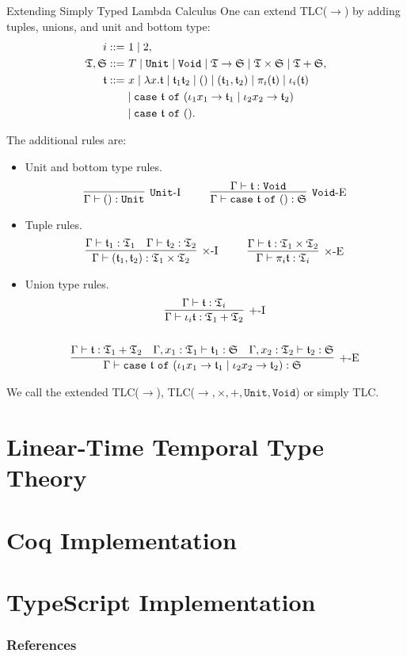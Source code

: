 \begin{frame}[allowframebreaks]{Extending Simply Typed Lambda Calculus}
    One can extend TLC($\rightarrow$) by adding tuples, unions, and unit and bottom type:
    \begin{align*}
    i ::=&~ 1 \mid 2, \\
    \mathfrak{T}, \mathfrak{S} ::=&~ T \mid \mathtt{Unit} \mid \mathtt{Void} \mid \mathfrak{T} \rightarrow \mathfrak{S} \mid \mathfrak{T} \times \mathfrak{S} \mid \mathfrak{T} + \mathfrak{S}, \\
    \mathfrak{t} ::=&~ x \mid \lambda x. \mathfrak{t} \mid \mathfrak{t}_1 \mathfrak{t}_2 \mid () \mid (\mathfrak{t}_1, \mathfrak{t}_2) \mid \pi_i(\mathfrak{t}) \mid \iota_i(\mathfrak{t}) \\ &\mid \mathtt{case}~\mathfrak{t}~\mathtt{of}~(\iota_1 x_1 \rightarrow \mathfrak{t}_1 \mid \iota_2 x_2 \rightarrow \mathfrak{t}_2) \\
    &\mid \mathtt{case}~\mathfrak{t}~\mathtt{of}~().
    \end{align*}
    
    The additional rules are:
    \begin{itemize}
        \item Unit and bottom type rules.
        \[
        \infer[\mathtt{Unit}\mbox{-I}]{\Gamma \vdash () : \mathtt{Unit}}{}
        ~~~~ ~~~~
        \infer[\mathtt{Void}\mbox{-E}]{\Gamma \vdash \mathtt{case}~\t~\mathtt{of}~() : \mathfrak{S}}{\Gamma \vdash \t : \mathtt{Void}}
        \]
        \item Tuple rules.
        \[
        \infer[\times\mbox{-I}]{\Gamma \vdash (\t_1, \t_2) : \T_1 \times \T_2}{\Gamma \vdash \t_1 : \T_1 & \Gamma \vdash \t_2 : \T_2}
        ~~~~ ~~~~
        \infer[\times\mbox{-E}]{\Gamma \vdash \pi_i \t : \T_i}{\Gamma \vdash \t : \T_1 \times \T_2}
        \]
        \item Union type rules.
        \begin{gather*}
        \infer[+\mbox{-I}]{\Gamma \vdash \iota_i \t : \T_1 + \T_2}{\Gamma \vdash \t : \T_i}
        \\ \\
        \infer[+\mbox{-E}]{\Gamma \vdash \mathtt{case}~\t~\mathtt{of}~(\iota_1 x_1 \rightarrow \t_1 \mid \iota_2 x_2 \rightarrow \t_2) : \mathfrak{S}}{
            \Gamma \vdash \t : \T_1 + \T_2
            &
            \Gamma, x_1 : \T_1 \vdash \t_1 : \mathfrak{S}
            &
            \Gamma, x_2 : \T_2 \vdash \t_2 : \mathfrak{S}
        }
        \end{gather*}
    \end{itemize}
    
    We call the extended TLC($\rightarrow$), TLC($\rightarrow, \times, +, \mathtt{Unit}, \mathtt{Void}$) or simply TLC.
\end{frame}

\section{Linear-Time Temporal Type Theory}

\section{Coq Implementation}

\section{TypeScript Implementation}

\begin{frame}[t,allowframebreaks]
\nocite{*}
\frametitle{References}


\end{frame}
